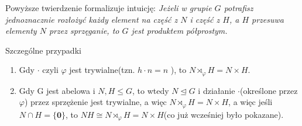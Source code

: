 \begin{remark}
Powyższe twierdzenie formalizuje intuicję: \textit{Jeżeli w grupie $G$ potrafisz jednoznacznie rozłożyć każdy element na część z $N$ i część z $H$, a $H$ przesuwa elementy $N$ przez sprzęganie, to $G$ jest produktem półprostym.}
\end{remark}

\begin{eg}
Szczególne przypadki

\begin{enumerate}[label=\arabic*)]
	\item Gdy $\cdot $ czyli $\varphi$ jest trywialne(tzn. $h\cdot n=n$ ), to $N\rtimes_{\varphi}H = N\times H$.
	\item Gdy G jest abelowa i $N,H \le G$, to wtedy $N\unlhd G$ i działanie $\cdot$(określone przez $\varphi$) przez sprzężenie jest trywialne, a więc $N\rtimes_{\varphi}H = N\times H$, a więc jeśli $N \cap H = \{\mathbf{0}\} $, to $NH \cong N\rtimes_{\varphi}H = N\times H$(co już wcześniej było pokazane).
\end{enumerate}

\end{eg}
